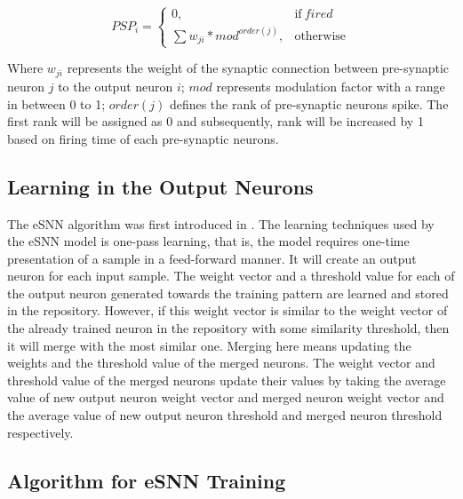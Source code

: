 \begin{equation}
PSP_i=
\begin{cases}
0, & \text{if}\ fired \\
\sum w_{ji}*mod^{order(j)}, & \text{otherwise}
\end{cases}
\end{equation}

Where  $w_{ji}$ represents the weight of the synaptic connection between pre-synaptic neuron $j$ to the output neuron $i$; $mod$ represents modulation factor with a range in between 0 to 1; $order(j)$ defines the rank of pre-synaptic neurons spike. The first rank will be assigned as 0 and subsequently, rank will be increased by 1 based on firing time of each pre-synaptic neurons. 

\subsection{Learning in the Output Neurons}

The eSNN algorithm was first introduced in \citep{wysoski2006adaptive,kasabov2007evolving}. The learning techniques used by the eSNN model is one-pass learning, that is, the model requires one-time presentation of a sample in a feed-forward manner. It will create an output neuron for each input sample. The weight vector and a threshold value for each of the output neuron generated towards the training pattern are learned and stored in the repository. However, if this weight vector is similar to the weight vector of the already trained neuron in the repository with some similarity threshold, then it will merge with the most similar one. Merging here means updating the weights and the threshold value of the merged neurons. The weight vector and threshold value of the merged neurons update their values by taking the average value of new output neuron weight vector and merged neuron weight vector and the average value of new output neuron threshold and merged neuron threshold respectively. 

\subsection{Algorithm for eSNN Training}

